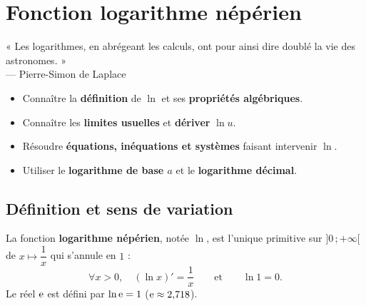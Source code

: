 
\chapter{Fonction logarithme népérien}

\begin{citationchapitre}
	« Les logarithmes, en abrégeant les calculs, ont pour ainsi dire doublé
	la vie des astronomes. »\\[0.4em]
	— Pierre-Simon de Laplace
\end{citationchapitre}

\begin{objectifs}
	\begin{itemize}[label=\textbullet]
		\item Connaître la \textbf{définition} de $\ln$ et ses \textbf{propriétés
		algébriques}.
		\item Connaître les \textbf{limites usuelles} et \textbf{dériver} $\ln u$.
		\item Résoudre \textbf{équations, inéquations et systèmes} faisant
		intervenir $\ln$.
		\item Utiliser le \textbf{logarithme de base $a$} et le \textbf{logarithme
		décimal}.
	\end{itemize}
\end{objectifs}


\section{Définition et sens de variation}

\begin{definition}
	La fonction \textbf{logarithme népérien}, notée $\ln$, est l'unique
	primitive sur $]0\,;+\infty[$ de $x\mapsto\dfrac{1}{x}$ qui s'annule en $1$ :
	\[
	\forall x>0,\quad (\ln x)'=\frac{1}{x}\qquad\text{et}\qquad \ln 1=0.
	\]
	Le réel $\mathrm{e}$ est défini par $\ln \mathrm{e} = 1$ ($\mathrm{e}\approx 2{,}718$).
\end{definition}

